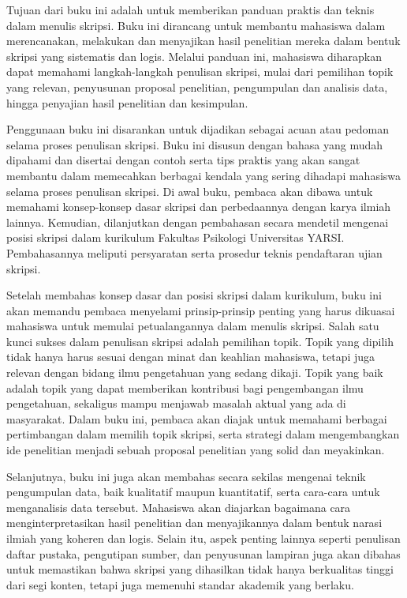 \documentclass[
  indonesian,
  letterpaper,
  DIV=11,
  numbers=noendperiod]{scrreprt}
\begin{document}
Tujuan dari buku ini adalah untuk memberikan panduan praktis dan teknis
dalam menulis skripsi. Buku ini dirancang untuk membantu mahasiswa dalam
merencanakan, melakukan dan menyajikan hasil penelitian mereka dalam
bentuk skripsi yang sistematis dan logis. Melalui panduan ini, mahasiswa
diharapkan dapat memahami langkah-langkah penulisan skripsi, mulai dari
pemilihan topik yang relevan, penyusunan proposal penelitian,
pengumpulan dan analisis data, hingga penyajian hasil penelitian dan
kesimpulan.

Penggunaan buku ini disarankan untuk dijadikan sebagai acuan atau
pedoman selama proses penulisan skripsi. Buku ini disusun dengan bahasa
yang mudah dipahami dan disertai dengan contoh serta tips praktis yang
akan sangat membantu dalam memecahkan berbagai kendala yang sering
dihadapi mahasiswa selama proses penulisan skripsi. Di awal buku,
pembaca akan dibawa untuk memahami konsep-konsep dasar skripsi dan
perbedaannya dengan karya ilmiah lainnya. Kemudian, dilanjutkan dengan
pembahasan secara mendetil mengenai posisi skripsi dalam kurikulum
Fakultas Psikologi Universitas YARSI. Pembahasannya meliputi persyaratan
serta prosedur teknis pendaftaran ujian skripsi.

Setelah membahas konsep dasar dan posisi skripsi dalam kurikulum, buku
ini akan memandu pembaca menyelami prinsip-prinsip penting yang harus
dikuasai mahasiswa untuk memulai petualangannya dalam menulis skripsi.
Salah satu kunci sukses dalam penulisan skripsi adalah pemilihan topik.
Topik yang dipilih tidak hanya harus sesuai dengan minat dan keahlian
mahasiswa, tetapi juga relevan dengan bidang ilmu pengetahuan yang
sedang dikaji. Topik yang baik adalah topik yang dapat memberikan
kontribusi bagi pengembangan ilmu pengetahuan, sekaligus mampu menjawab
masalah aktual yang ada di masyarakat. Dalam buku ini, pembaca akan
diajak untuk memahami berbagai pertimbangan dalam memilih topik skripsi,
serta strategi dalam mengembangkan ide penelitian menjadi sebuah
proposal penelitian yang solid dan meyakinkan.

Selanjutnya, buku ini juga akan membahas secara sekilas mengenai teknik
pengumpulan data, baik kualitatif maupun kuantitatif, serta cara-cara
untuk menganalisis data tersebut. Mahasiswa akan diajarkan bagaimana
cara menginterpretasikan hasil penelitian dan menyajikannya dalam bentuk
narasi ilmiah yang koheren dan logis. Selain itu, aspek penting lainnya
seperti penulisan daftar pustaka, pengutipan sumber, dan penyusunan
lampiran juga akan dibahas untuk memastikan bahwa skripsi yang
dihasilkan tidak hanya berkualitas tinggi dari segi konten, tetapi juga
memenuhi standar akademik yang berlaku.
\end{document}
